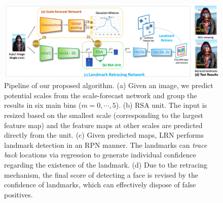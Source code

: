 \documentclass[10pt,twocolumn,letterpaper]{article}
\begin{document}
\begin{figure}[t]
	\begin{center}
		\includegraphics[width=.9\textwidth]{test}
	\end{center}
	\vspace{-.2cm}
	\caption{Pipeline of our proposed algorithm. (a) Given %
		an image, we predict potential scales from the scale-forecast network and group the results in six main bins ($m=0, \cdots, 5$). (b) RSA unit. The input is resized based on the smallest scale (corresponding to the largest feature map) and the feature maps at other scales are predicted directly from the unit. 
		(c)
		 Given predicted maps, LRN performs landmark detection in an RPN manner. The landmarks can \textit{trace back} locations via regression to generate individual confidence regarding the existence of the landmark. 
		(d) Due to the retracing mechanism, the final score of detecting a face 
		is revised by the confidence of landmarks,
		which can effectively dispose of false positives.
	}
	\label{fig:test_pipe}
	\vspace{-.4cm}
\end{figure}

\end{document}

